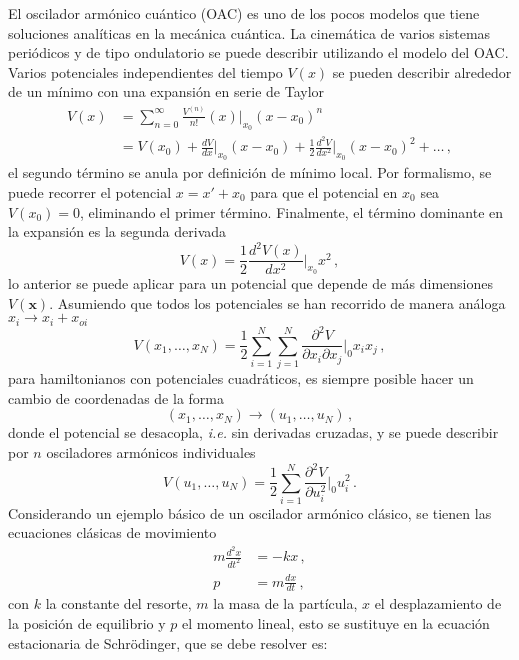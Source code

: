 El oscilador armónico cuántico (OAC) es uno de los pocos modelos que tiene soluciones analíticas en la mecánica cuántica. La cinemática de varios sistemas periódicos y de tipo ondulatorio se puede describir utilizando el modelo del OAC.
Varios potenciales independientes del tiempo $V(x)$ se pueden describir alrededor de un mínimo con una expansión en serie de Taylor
\begin{align*}
  V(x) & = \sum_{n=0}^{\infty} \frac{V^{(n)}}{n!} (x)|_{x_0} (x-x_0)^n \\ &= V(x_0) + \frac{dV}{dx}\Big|_{x_0} (x-x_0) + \frac{1}{2}\frac{d^2V}{dx^2}\Big|_{x_0} (x-x_0)^2 + \dots \,,
\end{align*}
el segundo término se anula por definición de mínimo local. Por formalismo, se puede recorrer el potencial $x = x' + x_0$ para que el potencial en $x_0$ sea $V(x_0) = 0$, eliminando el primer término. Finalmente, el término dominante en la expansión es la segunda derivada
\begin{equation}
  \label{OA.1}
  V(x) = \frac{1}{2}\frac{d^2V(x)}{dx^2}\Big|_{x_0}x^2 \,,
\end{equation}
lo anterior se puede aplicar para un potencial que depende de más dimensiones $V(\mathbf{x})$. Asumiendo que todos los potenciales se han recorrido de manera análoga $x_i \to x_i + x_{oi}$
\begin{equation*}
  V(x_1, \dots, x_N) = \frac{1}{2}\sum_{i=1}^N \sum_{j=1}^N \frac{\partial^2 V}{\partial x_i \partial x_j}\Big|_{0} x_i x_j \,,
\end{equation*}
para hamiltonianos con potenciales cuadráticos, es siempre posible hacer un cambio de coordenadas de la forma
\begin{equation*}
  (x_{1}, \dots, x_N) \to (u_1, \dots, u_N)\,,
\end{equation*}
donde el potencial se desacopla, \textit{i.e.} sin derivadas cruzadas, y se puede describir por $n$ osciladores armónicos individuales
\begin{equation*}
  V(u_1, \dots, u_N) = \frac{1}{2} \sum_{i=1}^{N} \frac{\partial^2 V}{\partial u_i^{2}}\Big|_0 u_i^2\,.
\end{equation*}
Considerando un ejemplo básico de un oscilador armónico clásico, se tienen las ecuaciones clásicas de movimiento
\begin{align}
  m \frac{d^2x}{dt^2} & = -kx \,, \label{OA.2}            \\
  p                   & = m\frac{dx}{dt} \,, \label{OA.3}
\end{align}
con $k$ la constante del resorte, $m$ la masa de la partícula, $x$ el desplazamiento de la posición de equilibrio y $p$ el momento lineal, esto se sustituye en la ecuación estacionaria de Schrödinger, que se debe resolver es:
